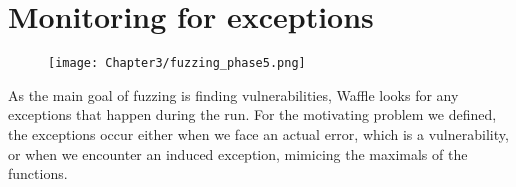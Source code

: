 \section{Monitoring for exceptions}

\begin{figure}[H]
    \centering
    \texttt{[image: Chapter3/fuzzing\_phase5.png]}
\end{figure}

As the main goal of fuzzing is finding vulnerabilities, Waffle looks for any exceptions that happen during the run. For the motivating problem we defined, the exceptions occur either when we face an actual error, which is a vulnerability, or when we encounter an induced exception, mimicing the maximals of the functions. 